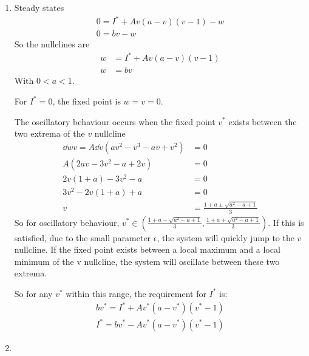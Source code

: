 \documentclass{X:/Documents/Coding/Latex/myassignment}
\begin{document}
\begin{enumerate}
\begin{enumerate}
	\end{enumerate}
	\item
	Steady states
	\begin{align*}
		0 =I^* + A v (a- v)(v -1) - w\\
		0 = bv - w
	\end{align*}
	So the nullclines are 
	\begin{align*}
		w &= I^* + A v (a- v)(v -1)\\
		w &= b v
	\end{align*}
	With $0<a<1$.

	For $I^* = 0$, the fixed point is $w = v = 0$.

	The oscillatory behaviour occurs when the fixed point $v^*$ exists between the two extrema of the $v$ nullcline
	\begin{align*}
		\dd wv = A\dd{}v\left(av^2 - v^3 -av + v^2\right) &=0\\
		A\left(2av - 3v^2 - a + 2v\right) &=0\\
		2v(1+a) - 3v^2 - a &=0\\
		3v^2 -2v(1+a) + a &= 0\\
		v &= \frac{1+a \pm \sqrt{a^2 - a+1}}{3}
	\end{align*}
	So for oscillatory behaviour, $v^* \in \left(\frac{1+a - \sqrt{a^2 - a+1}}{3}, \frac{1+a  + \sqrt{a^2 - a+1}}{3}\right)$.
	If this is satisfied, due to the small parameter $\epsilon$, the system will quickly jump to the $v$ nullcline. If the fixed point exists between a local maximum and a local minimum of the v nullcline,  the system will oscillate between these two extrema.
	


	So for any $v^*$ within this range, the requirement for $I^*$ is:
	\begin{align*}
		bv^* = I^* + A v^* (a- v^*)(v^* -1)\\
		I^* = bv^* - A v^* (a- v^*)(v^* -1) 
	\end{align*}


	\item 


\end{enumerate}
\end{document}
